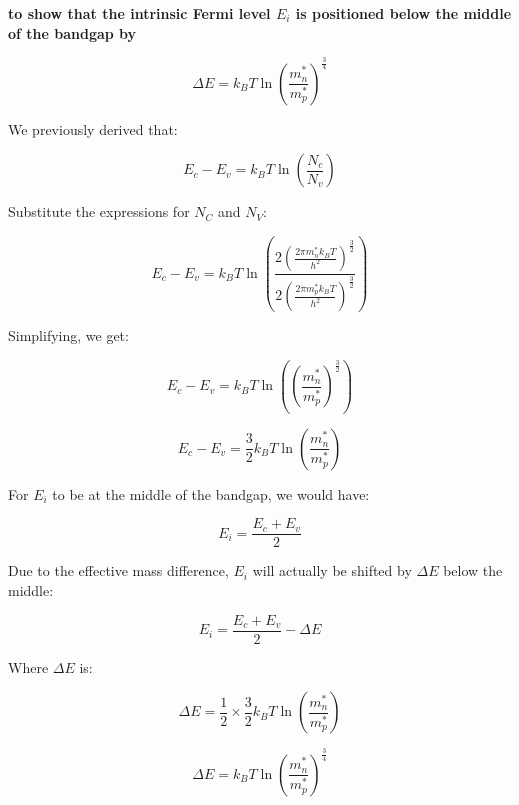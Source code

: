 \textbf{to show that the intrinsic Fermi level $E_i$ is positioned below the middle of the bandgap by}

\begin{equation*}
    \Delta E=k_{B} T \ln \left(\frac{m_{n}^{*}}{m_{p}^{*}}\right)^{\frac{3}{4}}
\end{equation*}

We previously derived that:

\begin{equation*}
E_c - E_v = k_B T \ln\left(\frac{N_c}{N_v}\right)
\end{equation*}

Substitute the expressions for \( N_C \) and \( N_V \):

\begin{equation*}
E_c - E_v = k_B T \ln\left(\frac{2\left(\frac{2 \pi m_{n}^{*} k_B T}{h^2}\right)^{\frac{3}{2}}}{2\left(\frac{2 \pi m_{p}^{*} k_B T}{h^2}\right)^{\frac{3}{2}}}\right)
\end{equation*}

Simplifying, we get:

\begin{equation*}
E_c - E_v = k_B T \ln\left(\left(\frac{m_{n}^{*}}{m_{p}^{*}}\right)^{\frac{3}{2}}\right)
\end{equation*}

\begin{equation*}
E_c - E_v = \frac{3}{2} k_B T \ln\left(\frac{m_{n}^{*}}{m_{p}^{*}}\right)
\end{equation*}

For \( E_i \) to be at the middle of the bandgap, we would have:

\begin{equation*}
E_i = \frac{E_c + E_v}{2}
\end{equation*}

Due to the effective mass difference, \( E_i \) will actually be shifted by \( \Delta E \) below the middle:

\begin{equation*}
E_i = \frac{E_c + E_v}{2} - \Delta E
\end{equation*}

Where \( \Delta E \) is:

\begin{equation*}
\Delta E = \frac{1}{2} \times \frac{3}{2} k_B T \ln\left(\frac{m_{n}^{*}}{m_{p}^{*}}\right)
\end{equation*}

\begin{equation*}
\Delta E = k_B T \ln\left(\frac{m_{n}^{*}}{m_{p}^{*}}\right)^{\frac{3}{4}}
\end{equation*}

